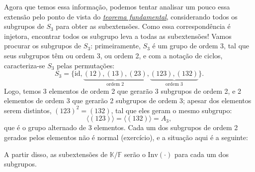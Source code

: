 \documentclass[../algebraIII_notes.tex]{subfiles}
\begin{document}
\begin{example}
	Agora que temos essa informação, podemos tentar analisar um pouco essa extensão pelo ponto de vista do \hyperlink{fundamental_galois}{\textit{teorema fundamental}}, considerando todos os subgrupos de \(S_{3}\) para obter as subextensões. Como essa correspondência é injetora, encontrar todos os subgrupo leva a todas as subextensões!
	Vamos procurar os subgrupos de \(S_{3}\): primeiramente, \(S_{3} \) é um grupo de ordem 3, tal que seus subgrupos têm ou ordem 3, ou ordem 2, e com a notação de ciclos, caracteriza-se \(S_{3}\) pelas permutações:
	\[
		S_{3} = \{\mathrm{id}, \underbrace{(12), (13), (23)}_{\text{ordem 2}}, \underbrace{(123), (132)}_{\text{ordem 3}}\}.
	\]
	Logo, temos 3 elementos de ordem 2 que gerarão 3 subgrupos de ordem 2, e 2 elementos de ordem 3 que gerarão 2 subgrupos de ordem 3; apesar dos elementos serem distintos, \((123)^{2}=(132)\), tal que eles geram o mesmo subgrupo:
	\[
		\langle (123) \rangle = \langle (132) \rangle = A_{3},
	\]
	que é o grupo alternado de 3 elementos. Cada um dos subgrupos de ordem 2 gerados pelos elementos não é normal (exercício), e a situação aqui é a seguinte:
	\begin{center}
	\end{center}
	A partir disso, as subextensões de \(\mathbb{K}/\mathbb{F}\) serão o \(\mathrm{Inv}(\cdot )\) para cada um dos subgrupos.
\end{example}
\end{document}

